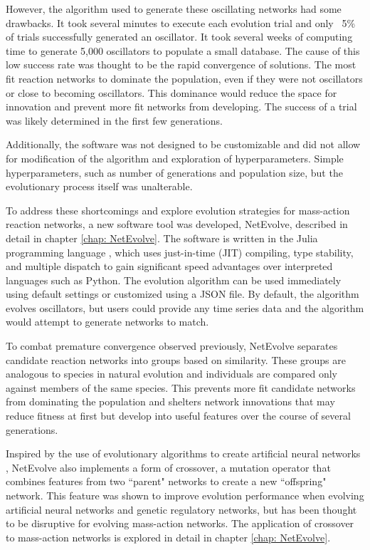 \documentclass[12pt]{report}
\begin{document}
However, the algorithm used to generate these oscillating networks had some drawbacks. It took several minutes to execute each evolution trial and only ~5\% of trials successfully generated an oscillator.  It took several weeks of computing time to generate 5,000 oscillators to populate a small database. The cause of this low success rate was thought to be the rapid convergence of solutions. The most fit reaction networks to dominate the population, even if they were not oscillators or close to becoming oscillators. This dominance would reduce the space for innovation and prevent more fit networks from developing. The success of a trial was likely determined in the first few generations.

Additionally, the software was not designed to be customizable and did not allow for modification of the algorithm and exploration of hyperparameters. Simple hyperparameters, such as number of generations and population size, but the evolutionary process itself was unalterable.

To address these shortcomings and explore evolution strategies for mass-action reaction networks, a new software tool was developed, NetEvolve, described in detail in chapter \ref{chap: NetEvolve}. The software is written in the Julia programming language \cite{bezanson2017julia}, which uses just-in-time (JIT) compiling, type stability, and multiple dispatch to gain significant speed advantages over interpreted languages such as Python. The evolution algorithm can be used immediately using default settings or customized using a JSON file. By default, the algorithm evolves oscillators, but users could provide any time series data and the algorithm would attempt to generate networks to match. 

To combat premature convergence observed previously, NetEvolve separates candidate reaction networks into groups based on similarity. These groups are analogous to species in natural evolution and individuals are compared only against members of the same species. This prevents more fit candidate networks from dominating the population and shelters network innovations that may reduce fitness at first but develop into useful features over the course of several generations. 

Inspired by the use of evolutionary algorithms to create artificial neural networks \cite{stanley_evolving_2002}, NetEvolve also implements a form of crossover, a mutation operator that combines features from two ``parent" networks to create a new ``offspring" network. This feature was shown to improve evolution performance when evolving artificial neural networks and genetic regulatory networks, but has been thought to be disruptive for evolving mass-action networks. The application of crossover to mass-action networks is explored in detail in chapter \ref{chap: NetEvolve}.
\end{document}
